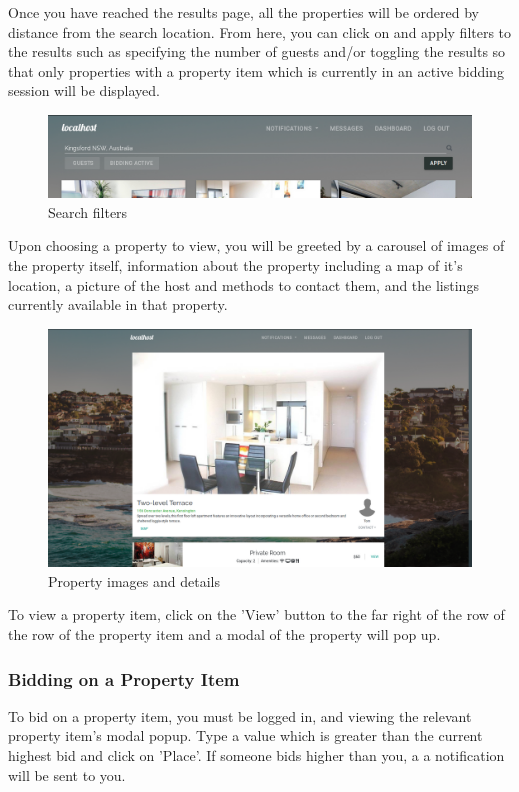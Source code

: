 Once you have reached the results page, all the properties will be ordered by
distance from the search location. From here, you can click on and apply
filters to the results such as specifying
the number of guests and/or toggling the results so that only properties with a
property item which is currently in an active bidding session will be displayed.

\begin{figure}[!h]
  \includegraphics[width=\linewidth]{assets/userManual/searchFilters.png}
  \caption{Search filters}
  \label{fig:searchFilters}
\end{figure}

Upon choosing a property to view, you will be greeted by a carousel of images of
the property itself, information about the property including a map of it's
location, a picture of the host and methods to contact them, and the listings
currently available in that property.

\begin{figure}[!h]
  \includegraphics[width=\linewidth]{assets/userManual/propertyPg.png}
  \caption{Property images and details}
  \label{fig:propertyPg}
\end{figure}

To view a property item, click on the 'View' button to the far right of the row
of the row of the property item and a modal of the property will pop up.

\newpage
\subsubsection{Bidding on a Property Item}
To bid on a property item, you must be logged in, and viewing the relevant
property item's modal popup. Type a value which is greater than the current
highest bid and click on 'Place'. If someone bids higher than you, a
a notification will be sent to you.

